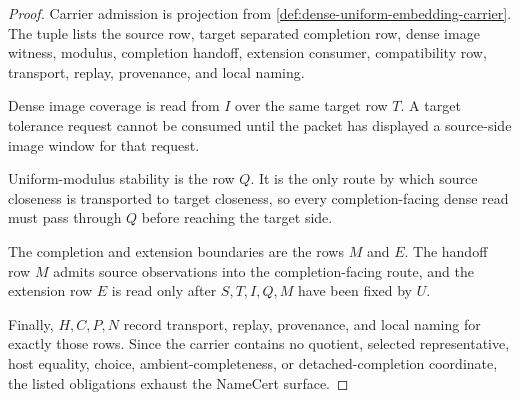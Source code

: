 \begin{proof}
Carrier admission is projection from \autoref{def:dense-uniform-embedding-carrier}. The tuple lists the source row, target separated completion row, dense image witness, modulus, completion handoff, extension consumer, compatibility row, transport, replay, provenance, and local naming.

Dense image coverage is read from $I$ over the same target row $T$. A target tolerance request cannot be consumed until the packet has displayed a source-side image window for that request.

Uniform-modulus stability is the row $Q$. It is the only route by which source closeness is transported to target closeness, so every completion-facing dense read must pass through $Q$ before reaching the target side.

The completion and extension boundaries are the rows $M$ and $E$. The handoff row $M$ admits source observations into the completion-facing route, and the extension row $E$ is read only after $S,T,I,Q,M$ have been fixed by $U$.

Finally, $H,C,P,N$ record transport, replay, provenance, and local naming for exactly those rows. Since the carrier contains no quotient, selected representative, host equality, choice, ambient-completeness, or detached-completion coordinate, the listed obligations exhaust the NameCert surface.
\end{proof}

